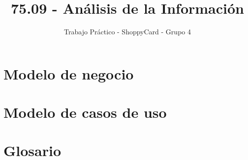 \documentclass{scrartcl}
\title{75.09 - Análisis de la Información}
\subtitle{Trabajo Práctico - ShoppyCard - Grupo 4}
\date{}
\author{}
\begin{document}
\maketitle
\tableofcontents
\clearpage

\part{Modelo de negocio}


\part{Modelo de casos de uso}


\part{Glosario}

\end{document}
